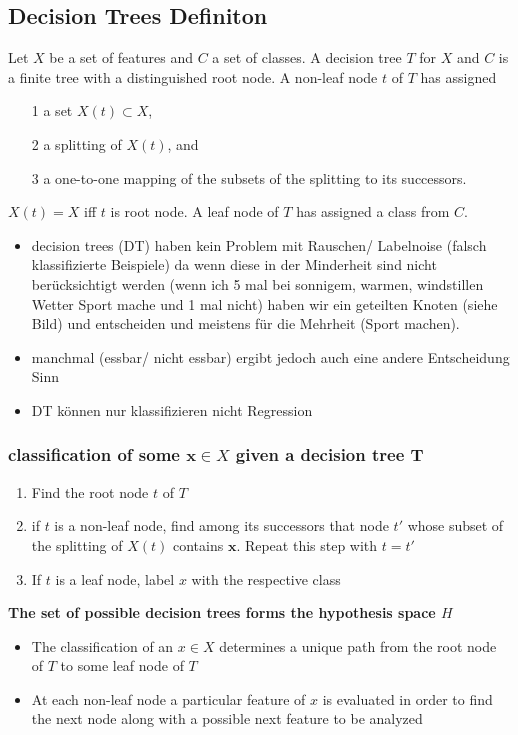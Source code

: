 \documentclass[11pt,a4paper]{article}
\begin{document}
\begin{flushleft}
\subsection{Decision Trees Definiton}

Let $X$ be a set of features and $C$ a set of classes. A decision tree $T$ for $X$ and $C$ is
a finite tree with a distinguished root node. A non-leaf node $t$ of $T$ has assigned
\begin{itemize}
\item[1] a set $X(t) \subset X$,
\item[2] a splitting of $X(t)$, and
\item[3] a one-to-one mapping of the
subsets of the splitting to its successors.
\end{itemize}
$X(t) = X$ iff $t$ is root node. A leaf node of $T$ has assigned a class from $C$.
\begin{itemize}
\item decision trees (DT) haben kein Problem mit Rauschen/ Labelnoise (falsch klassifizierte Beispiele) da wenn diese in der Minderheit sind nicht berücksichtigt werden (wenn ich 5 mal bei sonnigem, warmen, windstillen Wetter Sport mache und 1 mal nicht) haben wir ein geteilten Knoten (siehe Bild) und entscheiden und meistens für die Mehrheit (Sport machen). 
\item manchmal (essbar/ nicht essbar) ergibt jedoch auch eine andere Entscheidung Sinn
\item DT können nur klassifizieren nicht Regression 
\end{itemize}

\subsubsection{classification of some $\textbf{x} \in X$ given a decision tree T}
\begin{enumerate}
\item Find the root node $t$ of $T$
\item if $t$ is a non-leaf node, find among its successors that node $t'$ whose subset of
the splitting of $X(t)$ contains $\textbf{x}$. Repeat this step with $t = t'$
\item If $t$ is a leaf node, label $x$ with the respective class
\end{enumerate}

\textbf{The set of possible decision trees forms the hypothesis space $H$}
\begin{itemize}
\item The classification of an $x \in X$ determines a unique path from the root node of $T$ to some leaf
node of $T$
\item At each non-leaf node a particular feature of $x$ is evaluated in order to find the next node
along with a possible next feature to be analyzed
\end{itemize}

\end{flushleft}
\end{document}
